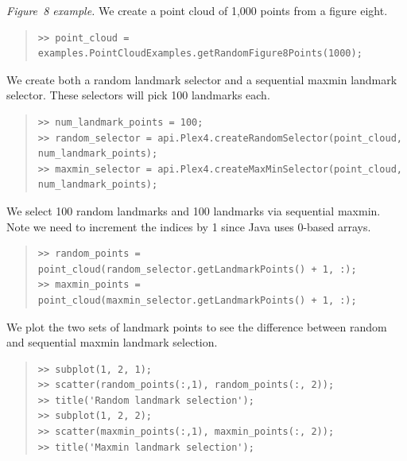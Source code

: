 \documentclass[amscd, amssymb, verbatim]{amsart}[12pt]
\theoremstyle{remark}
\theoremstyle{remark}
\theoremstyle{remark}
\begin{document}
{\em Figure~8 example.} We create a point cloud of 1,000 points from a figure eight.

\begin{quote} \begin{verbatim}
>> point_cloud = examples.PointCloudExamples.getRandomFigure8Points(1000);
\end{verbatim} \end{quote}

We create both a random landmark selector and a sequential maxmin landmark selector. These selectors will pick 100 landmarks each.

\begin{quote} \begin{verbatim}
>> num_landmark_points = 100;
>> random_selector = api.Plex4.createRandomSelector(point_cloud, num_landmark_points);
>> maxmin_selector = api.Plex4.createMaxMinSelector(point_cloud, num_landmark_points);
\end{verbatim} \end{quote}

We select 100 random landmarks and 100 landmarks via sequential maxmin. Note we need to increment the indices by 1 since Java uses 0-based arrays.

\begin{quote} \begin{verbatim}
>> random_points = point_cloud(random_selector.getLandmarkPoints() + 1, :);
>> maxmin_points = point_cloud(maxmin_selector.getLandmarkPoints() + 1, :);
\end{verbatim} \end{quote}

We plot the two sets of landmark points to see the difference between random and sequential maxmin landmark selection.

\begin{quote} \begin{verbatim}
>> subplot(1, 2, 1);
>> scatter(random_points(:,1), random_points(:, 2));
>> title('Random landmark selection');
>> subplot(1, 2, 2);
>> scatter(maxmin_points(:,1), maxmin_points(:, 2));
>> title('Maxmin landmark selection');
\end{verbatim} \end{quote}
\end{document}
